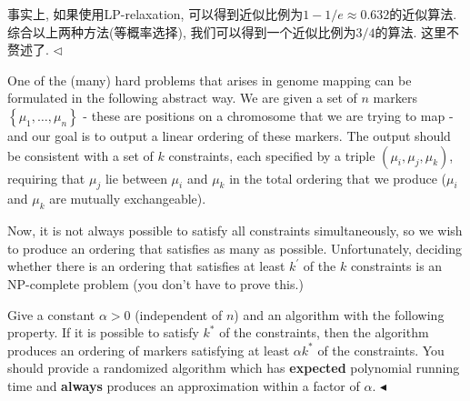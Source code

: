 \documentclass[11pt]{article}
\newenvironment{problem}[2][Problem]{\begin{trivlist}
    \item[\hskip \labelsep{\bfseries#1}\hskip\labelsep{\bfseries#2.}]\mbox{}\newline}{\hfill$\blacktriangleleft$\end{trivlist}}
\newenvironment{answer}[1][Solution]{\begin{trivlist}
\item[\hskip \labelsep{\bfseries#1.}\hskip \labelsep]}{\hfill$\lhd$\end{trivlist}}
\begin{document}
\begin{answer}
事实上, 如果使用LP-relaxation, 可以得到近似比例为$1-1/e \approx 0.632$的近似算法. 综合以上两种方法(等概率选择), 我们可以得到一个近似比例为$3/4$的算法. 这里不赘述了.
\end{answer}

\begin{problem}{3. (Genome Mapping)}
One of the (many) hard problems that arises in genome mapping can be formulated in the following abstract way. We are given a set of $n$ markers $\left\{\mu_{1}, \ldots, \mu_{n}\right\}$ - these are positions on a chromosome that we are trying to map - and our goal is to output a linear ordering of these markers. The output should be consistent with a set of $k$ constraints, each specified by a triple $\left(\mu_{i}, \mu_{j}, \mu_{k}\right)$, requiring that $\mu_{j}$ lie between $\mu_{i}$ and $\mu_{k}$ in the total ordering that we produce ($\mu_i$ and $\mu_k$ are mutually exchangeable).

Now, it is not always possible to satisfy all constraints simultaneously, so we wish to produce an ordering that satisfies as many as possible. Unfortunately, deciding whether there is an ordering that satisfies at least $k^{\prime}$ of the $k$ constraints is an NP-complete problem (you don't have to prove this.)

Give a constant $\alpha>0$ (independent of $n$) and an algorithm with the following property. If it is possible to satisfy $k^{*}$ of the constraints, then the algorithm produces an ordering of markers satisfying at least $\alpha k^{*}$ of the constraints. You should provide a randomized algorithm which has \textbf{expected} polynomial running time and \textbf{always} produces an approximation within a factor of $\alpha$.
\end{problem}
\end{document}
